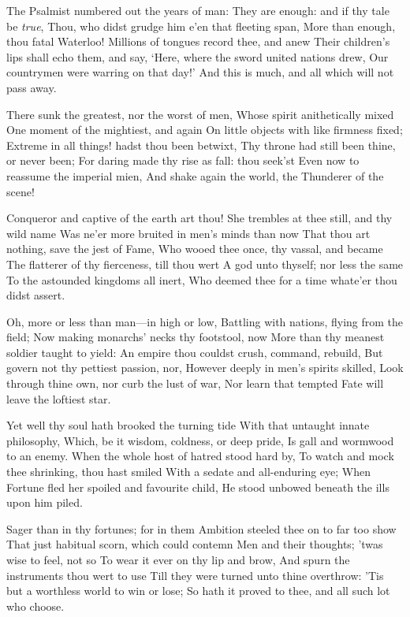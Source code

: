 \documentclass[10pt,twocolumn]{book}
\begin{document}
   The Psalmist numbered out the years of man:
   They are enough:  and if thy tale be \textit{true},
   Thou, who didst grudge him e'en that fleeting span,
   More than enough, thou fatal Waterloo!
   Millions of tongues record thee, and anew
   Their children's lips shall echo them, and say,
   `Here, where the sword united nations drew,
   Our countrymen were warring on that day!'
And this is much, and all which will not pass away.


   There sunk the greatest, nor the worst of men,
   Whose spirit anithetically mixed
   One moment of the mightiest, and again
   On little objects with like firmness fixed;
   Extreme in all things! hadst thou been betwixt,
   Thy throne had still been thine, or never been;
   For daring made thy rise as fall:  thou seek'st
   Even now to reassume the imperial mien,
And shake again the world, the Thunderer of the scene!


   Conqueror and captive of the earth art thou!
   She trembles at thee still, and thy wild name
   Was ne'er more bruited in men's minds than now
   That thou art nothing, save the jest of Fame,
   Who wooed thee once, thy vassal, and became
   The flatterer of thy fierceness, till thou wert
   A god unto thyself; nor less the same
   To the astounded kingdoms all inert,
Who deemed thee for a time whate'er thou didst assert.


   Oh, more or less than man---in high or low,
   Battling with nations, flying from the field;
   Now making monarchs' necks thy footstool, now
   More than thy meanest soldier taught to yield:
   An empire thou couldst crush, command, rebuild,
   But govern not thy pettiest passion, nor,
   However deeply in men's spirits skilled,
   Look through thine own, nor curb the lust of war,
Nor learn that tempted Fate will leave the loftiest star.


   Yet well thy soul hath brooked the turning tide
   With that untaught innate philosophy,
   Which, be it wisdom, coldness, or deep pride,
   Is gall and wormwood to an enemy.
   When the whole host of hatred stood hard by,
   To watch and mock thee shrinking, thou hast smiled
   With a sedate and all-enduring eye;
   When Fortune fled her spoiled and favourite child,
He stood unbowed beneath the ills upon him piled.


   Sager than in thy fortunes; for in them
   Ambition steeled thee on to far too show
   That just habitual scorn, which could contemn
   Men and their thoughts; 'twas wise to feel, not so
   To wear it ever on thy lip and brow,
   And spurn the instruments thou wert to use
   Till they were turned unto thine overthrow:
   'Tis but a worthless world to win or lose;
So hath it proved to thee, and all such lot who choose.
\end{document}
